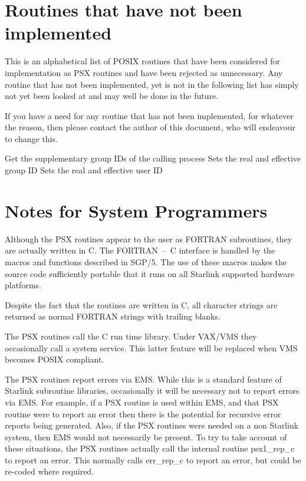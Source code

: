 \newpage
\section{Routines that have not been implemented}
\label{not-implelmented}

This is an alphabetical list of POSIX routines that have been considered for
implementation as PSX routines and have been rejected as unnecessary. Any
routine that has not been implemented, yet is not in the following list has
simply not yet been looked at and may well be done in the future.

If you have a need for any routine that has not been implemented, for whatever
the reason, then please contact the author of this document, who will endeavour
to change this.

            {Get the supplementary group IDs of the calling process}
            {Sets the real and effective group ID}
            {Sets the real and effective user ID}


\newpage
\section{Notes for System Programmers}

Although the PSX routines appear to the user as FORTRAN subroutines, they are
actually written in C. The FORTRAN~--~C interface is handled by the macros and
functions described in SGP/5. The use of these macros makes the source code
sufficiently portable that it runs on all Starlink supported hardware
platforms.

Despite the fact that the routines are written in C, all character strings are
returned as normal FORTRAN strings with trailing blanks.

The PSX routines call the C run time library. Under VAX/VMS they occasionally
call a system service. This latter feature will be replaced when VMS becomes
POSIX compliant.

The PSX routines report errors via EMS. While this is a standard feature of
Starlink subroutine libraries, occasionally it will be necessary not to report
errors via EMS. For example, if a PSX routine is used within EMS, and that PSX
routine were to report an error then there is the potential for recursive error
reports being generated. Also, if the PSX routines were needed on a non
Starlink system, then EMS would not necessarily be present. To try to take
account of these situations, the PSX routines actually call the internal
routine psx1\_rep\_c to report an error. This normally calls err\_rep\_c to
report an error, but could be re-coded where required.

